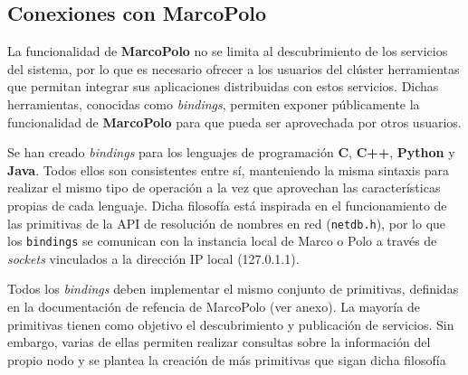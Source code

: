 

\subsection{Conexiones con MarcoPolo}

La funcionalidad de \textbf{MarcoPolo} no se limita al descubrimiento de los servicios del sistema, por lo que es necesario ofrecer a los usuarios del clúster herramientas que permitan integrar sus aplicaciones distribuidas con estos servicios. Dichas herramientas, conocidas como \textit{bindings}, permiten exponer públicamente la funcionalidad de \textbf{MarcoPolo} para que pueda ser aprovechada por otros usuarios.

Se han creado \textit{bindings} para los lenguajes de programación \textbf{C}, \textbf{C++}, \textbf{Python} y \textbf{Java}. Todos ellos son consistentes entre sí, manteniendo la misma sintaxis para realizar el mismo tipo de operación a la vez que aprovechan las características propias de cada lenguaje. Dicha filosofía está inspirada en el funcionamiento de las primitivas de la API de resolución de nombres en red (\texttt{netdb.h})\cite{netdb}, por lo que los \texttt{bindings} se comunican con la instancia local de Marco o Polo a través de \textit{sockets} vinculados a la dirección IP local (127.0.1.1).

Todos los \textit{bindings} deben implementar el mismo conjunto de primitivas, definidas en la documentación de refencia de MarcoPolo (ver anexo). La mayoría de primitivas tienen como objetivo el descubrimiento y publicación de servicios. Sin embargo, varias de ellas permiten realizar consultas sobre la información del propio nodo y se plantea la creación de más primitivas que sigan dicha filosofía


